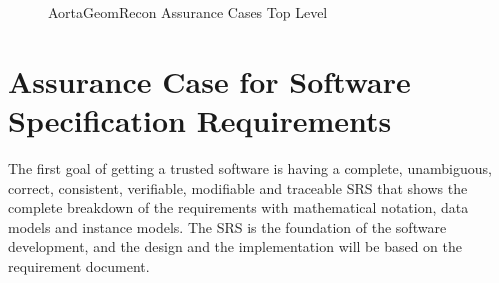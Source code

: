 \begin{figure}[hp]
    \centering
    \caption[AortaGeomRecon Assurance Cases Top Level]{AortaGeomRecon Assurance Cases Top Level}
    \label{fig_agr_ac_top}
\end{figure}


\section{Assurance Case for Software Specification Requirements}

The first goal of getting a trusted software is having a complete, unambiguous, correct, consistent, verifiable, modifiable and traceable SRS that shows the complete breakdown of the requirements with mathematical notation, data models and instance models. The SRS is the foundation of the software development, and the design and the implementation will be based on the requirement document.

